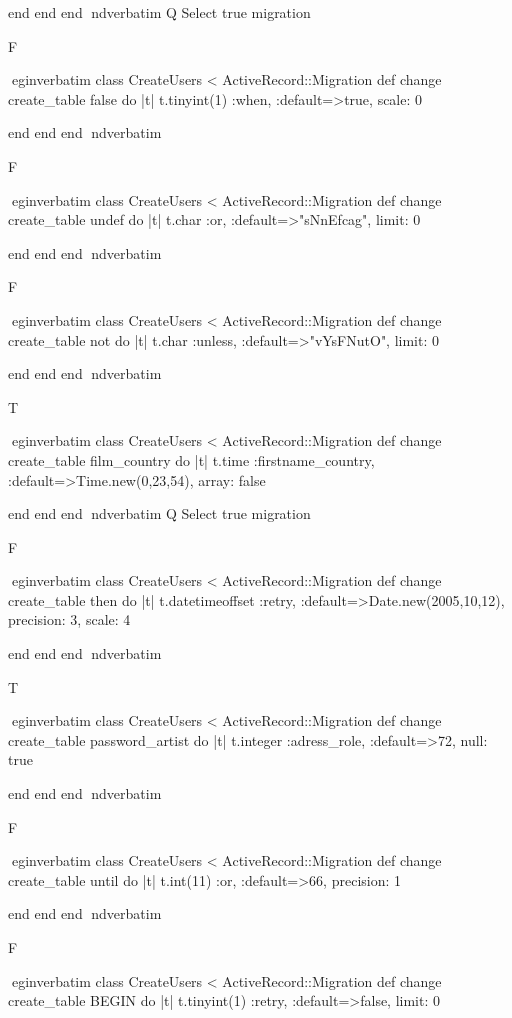    end 
  end 
end
nd{verbatim}
Q
 Select true migration

F

egin{verbatim}
 class CreateUsers < ActiveRecord::Migration 
  def change 
    create_table false do |t| 
      t.tinyint(1) :when, :default=>true, scale: 0
    
    end 
  end 
end
nd{verbatim}

F

egin{verbatim}
 class CreateUsers < ActiveRecord::Migration 
  def change 
    create_table undef do |t| 
      t.char :or, :default=>"sNnEfcag", limit: 0
    
    end 
  end 
end
nd{verbatim}

F

egin{verbatim}
 class CreateUsers < ActiveRecord::Migration 
  def change 
    create_table not do |t| 
      t.char :unless, :default=>"vYsFNutO", limit: 0
    
    end 
  end 
end
nd{verbatim}

T

egin{verbatim}
 class CreateUsers < ActiveRecord::Migration 
  def change 
    create_table film_country do |t| 
      t.time :firstname_country, :default=>Time.new(0,23,54), array: false
    
    end 
  end 
end
nd{verbatim}
Q
 Select true migration

F

egin{verbatim}
 class CreateUsers < ActiveRecord::Migration 
  def change 
    create_table then do |t| 
      t.datetimeoffset :retry, :default=>Date.new(2005,10,12), precision: 3, scale: 4
    
    end 
  end 
end
nd{verbatim}

T

egin{verbatim}
 class CreateUsers < ActiveRecord::Migration 
  def change 
    create_table password_artist do |t| 
      t.integer :adress_role, :default=>72, null: true
    
    end 
  end 
end
nd{verbatim}

F

egin{verbatim}
 class CreateUsers < ActiveRecord::Migration 
  def change 
    create_table until do |t| 
      t.int(11) :or, :default=>66, precision: 1
    
    end 
  end 
end
nd{verbatim}

F

egin{verbatim}
 class CreateUsers < ActiveRecord::Migration 
  def change 
    create_table BEGIN do |t| 
      t.tinyint(1) :retry, :default=>false, limit: 0
    

